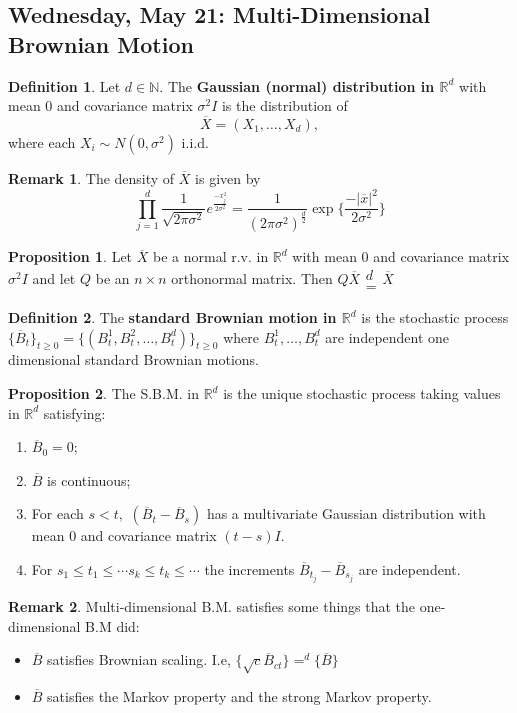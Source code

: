 \documentclass[10pt, oneside]{article}
\newcommand{\bbR}{\mathbb{R}}
\newcommand{\bbN}{\mathbb{N}}
\theoremstyle{definition}
\newtheorem{defn}{Definition}
\newtheorem{prop}{Proposition}
\newtheorem{rem}{Remark}
\begin{document}
\newpage
\subsection{Wednesday, May 21: Multi-Dimensional Brownian Motion}
\begin{defn}
Let $d \in \bbN.$ The \textbf{Gaussian (normal) distribution in $\bbR^d$ } with mean $0$ and covariance matrix $\sigma^2 I$ is the distribution of 
\[\overline{X} = (X_1, \dots, X_d),\] where each $X_i \sim N(0,\sigma^2)$ i.i.d. 
\end{defn}

\begin{rem}
The density of $\overline{X}$ is given by 
\[\prod_{j=1}^d \frac{1}{\sqrt{2\pi \sigma^2}}e^{\frac{-x_j^2}{2\sigma^2}} = \frac{1}{(2\pi \sigma^2)^{\frac d2}}\exp\{\frac{-|\overline{x}|^2}{2\sigma^2}\}\]
\end{rem}

\begin{prop}
Let $\overline{X}$ be a normal r.v. in $\bbR^d$ with mean $0$ and covariance matrix $\sigma^2 I $ and let $Q$ be an $n\times n$ orthonormal matrix. Then $Q\overline{X} \substack{d\\=} \overline{X}$
\end{prop}

\begin{defn}
The \textbf{standard Brownian motion in $\bbR^d$} is the stochastic process $\{\overline{B}_t\}_{t\geq 0} = \{(B_t^1, B_t^2, \dots, B_t^d)\}_{t\geq 0}$ where $B_t^1, \dots, B_t^d$ are independent one dimensional standard Brownian motions. 
\end{defn}

\begin{prop}
The S.B.M. in $\bbR^d$ is the unique stochastic process taking values in $\bbR^d$ satisfying:
\begin{enumerate}
\item $\overline{B}_0 = 0$;
\item $\overline{B}$ is continuous;
\item For each $s< t,$ $(\overline{B}_t - \overline{B}_s)$ has a multivariate Gaussian distribution with mean $0$ and covariance matrix $(t-s)I.$ 
\item For $s_1 \leq t_1 \leq \cdots s_k \leq t_k \leq \cdots $ the increments $\overline{B}_{t_j}- \overline{B}_{s_j}$ are independent.
\end{enumerate}
\end{prop}

\begin{rem}
Multi-dimensional B.M. satisfies some things that the one-dimensional B.M did:
\begin{itemize}
\item $\overline{B}$ satisfies Brownian scaling. I.e, $\{\sqrt c \overline{B}_{ct}\} =^d \{\overline{B}\}$
\item $\overline{B}$ satisfies the Markov property and the strong Markov property.
\end{itemize}
\end{rem}
\end{document}
